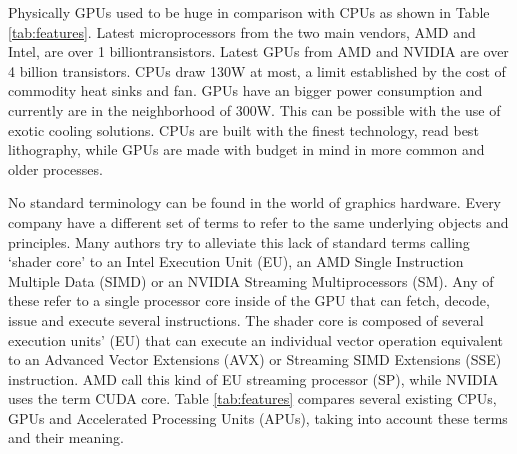 \documentclass[review]{elsarticle}
\begin{document}


Physically GPUs used to be huge in comparison with CPUs as shown in Table \ref{tab:features}. Latest microprocessors from the two main vendors, AMD and Intel, are over 1 billiontransistors. Latest GPUs from AMD and NVIDIA \cite{nvidia} are over 4 billion transistors. CPUs draw 130W at most, a limit established by the cost of commodity heat sinks and fan. GPUs have an bigger power consumption and currently are in the neighborhood of 300W. This can be possible with the use of exotic cooling solutions. CPUs are built with
the finest technology, read best lithography, while GPUs are made with budget in mind in more common and older processes. %

No standard terminology can be found in the world of graphics hardware.
Every company have a  different set of terms to refer to the same
underlying objects and principles. Many authors try to alleviate this
lack of standard terms calling `shader core' to an Intel Execution
Unit (EU), an AMD Single Instruction Multiple Data (SIMD) or an NVIDIA
Streaming Multiprocessors (SM). Any of these refer to a single
processor core inside of the GPU that can fetch, decode, issue and
execute several instructions. The shader core is composed of several
execution units' (EU) that can execute an individual vector operation
equivalent to an Advanced Vector Extensions (AVX) or Streaming SIMD
Extensions (SSE) instruction. AMD call this kind of EU streaming
processor (SP), while NVIDIA uses the term CUDA core. Table
\ref{tab:features} compares several existing CPUs, GPUs and
Accelerated Processing Units (APUs), taking into account these terms
and their meaning. %
\end{document}
